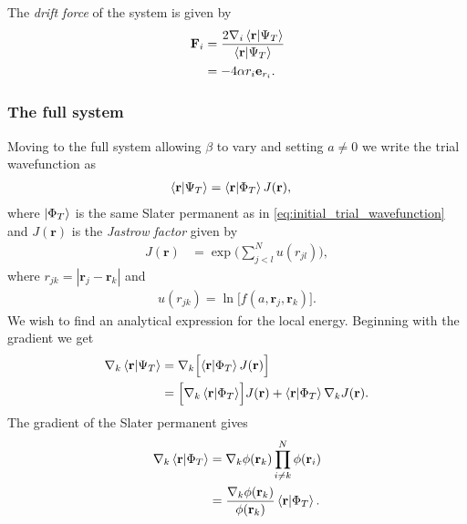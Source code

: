 \documentclass[
    a4paper, aps, twocolumn, floatfix, superscriptaddress]{revtex4-1}
\newcommand{\vf}{\mathbf}
\newcommand{\1}{\mathds{1}}
\begin{document}
            The \textit{drift force} of the system is given by
            \begin{align}
                \vf{F}_i
                &=
                \frac{2\nabla_i\bra{\vf{r}}\ket{\Psi_T}}
                {\bra{\vf{r}}\ket{\Psi_T}} \\
                &= -4\alpha r_i\vf{e}_{{r_i}}.
            \end{align}

        \subsubsection{The full system}
            Moving to the full system allowing $\beta$ to vary and setting $a
            \neq 0$ we write the trial wavefunction as
            \begin{align}
                \bra{\vf{r}}\ket{\Psi_T}
                &=
                \bra{\vf{r}}\ket{\Phi_T}
                J(\vf{r}),
            \end{align}
            where $\ket{\Phi_T}$ is the same Slater permanent as in
            \autoref{eq:initial_trial_wavefunction} and $J(\vf{r})$ is the
            \textit{Jastrow factor} given by
            \begin{align}
                J(\vf{r})
                &=
                \exp\Biggl(
                    \sum_{j < l}^N u(r_{jl})
                \Biggr),
            \end{align}
            where $r_{jk} = |\vf{r}_j - \vf{r}_k|$ and
            \begin{align}
                u(r_{jk}) = \ln\bigl[f(a, \vf{r}_j, \vf{r}_k)\bigr].
            \end{align}
            We wish to find an analytical expression for the local energy.
            Beginning with the gradient we get
            \begin{align}
                \nabla_k\bra{\vf{r}}\ket{\Psi_T}
                &= \nabla_k\Bigl[
                    \bra{\vf{r}}\ket{\Phi_T}
                    J(\vf{r})
                \Bigr] \\
                &=
                \Bigl[
                    \nabla_k
                    \bra{\vf{r}}\ket{\Phi_T}
                \Bigr]
                J(\vf{r})
                + \bra{\vf{r}}\ket{\Phi_T}
                \nabla_k J(\vf{r}).
            \end{align}
            The gradient of the Slater permanent gives
            \begin{align}
                \nabla_k
                \bra{\vf{r}}\ket{\Phi_T}
                &=
                \nabla_k\phi(\vf{r}_k)
                \prod_{i \neq k}^N\phi(\vf{r}_i) \\
                &= \frac{\nabla_k\phi(\vf{r}_k)}{\phi(\vf{r}_k)}
                \bra{\vf{r}}\ket{\Phi_T}.
            \end{align}
\end{document}
